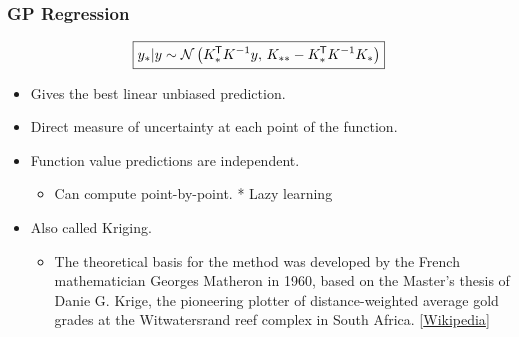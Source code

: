 \begin{frame} \frametitle{GP Regression}
\begin{equation}
  \boxed{ y_*|y \sim \mathcal{N}\left(K_*^{\mkern-1.5mu\mathsf{T}} K^{-1}y,\,K_{**}-K_*^{\mkern-1.5mu\mathsf{T}} K^{-1}K_*\right) }
\end{equation}
\begin{itemize}
  \item Gives the best linear unbiased prediction.
  \item Direct measure of uncertainty at each point of the function.
  \item Function value predictions are independent.
  \begin{itemize}
    \item Can compute point-by-point. \hspace{5mm}
    {\small\color{gray} * Lazy learning}
  \end{itemize}
  \item Also called Kriging.
  \begin{itemize}
    \item The theoretical basis for the method was developed by the French
      mathematician Georges Matheron in 1960, based on the Master's thesis of
      Danie G. Krige, the pioneering plotter of distance-weighted average gold
      grades at the Witwatersrand reef complex in South Africa.
      [\href{https://en.wikipedia.org/wiki/Kriging}{Wikipedia}]
  \end{itemize}
\end{itemize}
\end{frame}

